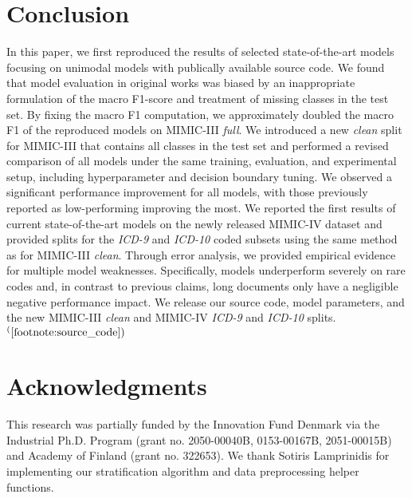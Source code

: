 {\section{Conclusion}
In this paper, we first reproduced the results of selected state-of-the-art models focusing on unimodal models with publically available source code. 
We found that model evaluation in original works was biased by an inappropriate formulation of the macro F1-score and treatment of missing classes in the test set. By fixing the macro F1 computation, we approximately doubled the macro F1 of the reproduced models on MIMIC-III \textit{full}. 
We introduced a new \textit{clean} split for MIMIC-III that contains all classes in the test set and performed a revised comparison of all models under the same training, evaluation, and experimental setup, including hyperparameter and decision boundary tuning. We observed a significant performance improvement for all models, with those previously reported as low-performing improving the most. 
We reported the first results of current state-of-the-art models on the newly released MIMIC-IV dataset \parencite{johnsonMIMICIVFreelyAccessible2023, goldbergerPhysioBankPhysioToolkitPhysioNet2000} and provided splits for the \textit{ICD-9} and \textit{ICD-10} coded subsets using the same method as for MIMIC-III \textit{clean}.
Through error analysis, we provided empirical evidence for multiple model weaknesses. Specifically, models underperform severely on rare codes 
and, in contrast to previous claims, long documents only have a negligible negative performance impact. 
We release our source code, model parameters, and the new MIMIC-III \textit{clean} and MIMIC-IV \textit{ICD-9} and \textit{ICD-10} splits.$^(\ref{footnote:source_code})$

\section*{Acknowledgments}
This research was partially funded by the Innovation Fund Denmark via the Industrial Ph.D. Program (grant no. 2050-00040B, 0153-00167B, 2051-00015B) and Academy of Finland (grant no. 322653).
We thank Sotiris Lamprinidis for implementing our stratification algorithm and data preprocessing helper functions.
   
}
